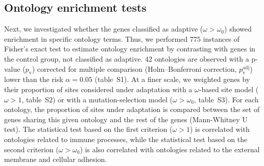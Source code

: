 \documentclass{article}
\begin{document}
    \subsection*{Ontology enrichment tests}
    Next, we investigated whether the genes classified as adaptive ($\omega > \omega_{0}$) showed enrichment in specific ontology terms.
    Thus, we performed $775$ instances of Fisher's exact test to estimate ontology enrichment by contrasting with genes in the control group, not classified as adaptive.
    $42$ ontologies are observed with a p-value ($p_{\mathrm{v}}$) corrected for multiple comparison (Holm–Bonferroni correction, $p_{\mathrm{v}}^{\mathrm{adj}}$) lower than the risk $\alpha=0.05$ (table~S1).
    At a finer scale, we weighted genes by their proportion of sites considered under adaptation with a $\omega$-based site model ($\omega > 1$, table~S2) or with a mutation-selection model ($\omega > \omega_{0}$, table~S3).
    For each ontology, the proportion of sites under adaptation is compared between the set of genes sharing this given ontology and the rest of the genes (Mann-Whitney U test).
    The statistical test based on the first criterion ($\omega>1$) is correlated with ontologies related to immune processes, while the statistical test based on the second criterion ($\omega > \omega_{0}$) is also correlated with ontologies related to the external membrane and cellular adhesion.
\end{document}
